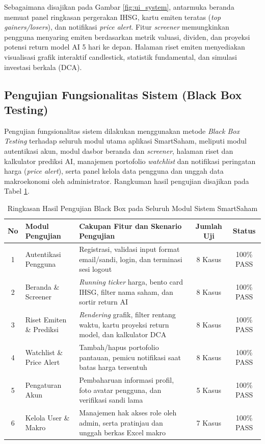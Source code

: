 \documentclass[10pt,a4paper]{article}
\begin{document}
Sebagaimana disajikan pada Gambar \ref{fig:ui_system}, antarmuka beranda memuat panel ringkasan pergerakan IHSG, kartu emiten teratas (\textit{top gainers/losers}), dan notifikasi \textit{price alert}. Fitur \textit{screener} memungkinkan pengguna menyaring emiten berdasarkan metrik valuasi, dividen, dan proyeksi potensi return model AI 5 hari ke depan. Halaman riset emiten menyediakan visualisasi grafik interaktif candlestick, statistik fundamental, dan simulasi investasi berkala (DCA).

\subsection{Pengujian Fungsionalitas Sistem (Black Box Testing)}
Pengujian fungsionalitas sistem dilakukan menggunakan metode \textit{Black Box Testing} terhadap seluruh modul utama aplikasi SmartSaham, meliputi modul autentikasi akun, modul dasbor beranda dan \textit{screener}, halaman riset dan kalkulator prediksi AI, manajemen portofolio \textit{watchlist} dan notifikasi peringatan harga (\textit{price alert}), serta panel kelola data pengguna dan unggah data makroekonomi oleh administrator. Rangkuman hasil pengujian disajikan pada Tabel \ref{tab:blackbox_summary}.

\begin{table}[htbp]
  \centering
  \caption{Ringkasan Hasil Pengujian Black Box pada Seluruh Modul Sistem SmartSaham}
  \label{tab:blackbox_summary}
  \fontsize{8.5pt}{10.5pt}\selectfont
  \begin{tabularx}{\textwidth}{clp{6.8cm}cc}
    \toprule
    \textbf{No} & \textbf{Modul Pengujian} & \textbf{Cakupan Fitur dan Skenario Pengujian} & \textbf{Jumlah Uji} & \textbf{Status} \\
    \midrule
    1 & Autentikasi Pengguna & Registrasi, validasi input format email/sandi, login, dan terminasi sesi logout & 8 Kasus & 100\% PASS \\
    2 & Beranda \& Screener & \textit{Running ticker} harga, bento card IHSG, filter nama saham, dan sortir return AI & 8 Kasus & 100\% PASS \\
    3 & Riset Emiten \& Prediksi & \textit{Rendering} grafik, filter rentang waktu, kartu proyeksi return model, dan kalkulator DCA & 8 Kasus & 100\% PASS \\
    4 & Watchlist \& Price Alert & Tambah/hapus portofolio pantauan, pemicu notifikasi saat batas harga tersentuh & 8 Kasus & 100\% PASS \\
    5 & Pengaturan Akun & Pembaharuan informasi profil, foto avatar pengguna, dan verifikasi sandi lama & 5 Kasus & 100\% PASS \\
    6 & Kelola User \& Makro & Manajemen hak akses role oleh admin, serta pratinjau dan unggah berkas Excel makro & 7 Kasus & 100\% PASS \\
    \bottomrule
  \end{tabularx}
\end{table}
\end{document}
